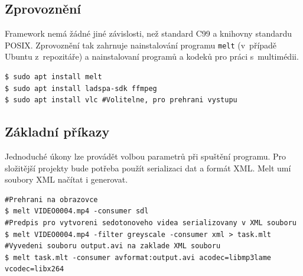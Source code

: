 \subsection{Zprovoznění}
Framework nemá žádné jiné závislosti, než standard C99 a knihovny standardu POSIX. Zprovoznění tak zahrnuje nainstalování programu \texttt{melt} (v~případě Ubuntu z~repozitáře) a nainstalovaní programů a kodeků pro práci s~multimédii.
\begin{lstlisting}[style=bash]
$ sudo apt install melt
$ sudo apt install ladspa-sdk ffmpeg
$ sudo apt install vlc #Volitelne, pro prehrani vystupu
\end{lstlisting}

\subsection{Základní příkazy}
Jednoduché úkony lze provádět volbou parametrů při spuštění programu. Pro složitější projekty bude potřeba použít serializaci dat a formát XML. Melt umí soubory XML načítat i generovat.
\begin{lstlisting}[style=bash]
#Prehrani na obrazovce
$ melt VIDEO0004.mp4 -consumer sdl
#Predpis pro vytvoreni sedotonoveho videa serializovany v XML souboru
$ melt VIDEO0004.mp4 -filter greyscale -consumer xml > task.mlt 
#Vyvedeni souboru output.avi na zaklade XML souboru
$ melt task.mlt -consumer avformat:output.avi acodec=libmp3lame vcodec=libx264
\end{lstlisting}
